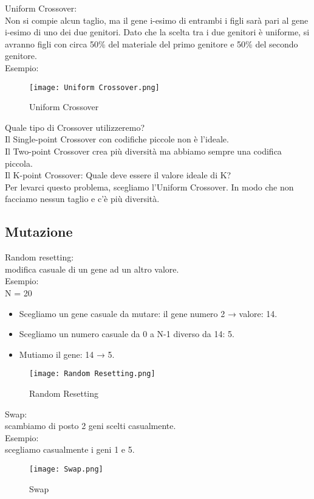 \documentclass[10pt,a4paper]{article}
\begin{document}
    Uniform Crossover:\\
    Non si compie alcun taglio, ma il gene i-esimo di entrambi i figli sarà pari al gene i-esimo di uno 
    dei due genitori. Dato che la scelta tra i due genitori è uniforme, si avranno figli 
    con circa 50\% del materiale del primo genitore e 50\% del secondo genitore.\\
    Esempio:
    \begin{figure}[h!]
      \centering
      \caption{Uniform Crossover}
      \texttt{[image: Uniform Crossover.png]}
      \label{UniformCrossover}
    \end{figure}
    
    Quale tipo di Crossover utilizzeremo?\\
    Il Single-point Crossover con codifiche piccole non è l’ideale.\\
    Il Two-point Crossover crea più diversità ma abbiamo sempre una codifica piccola.\\
    Il K-point Crossover: Quale deve essere il valore ideale di K?\\
    Per levarci questo problema, scegliamo l’Uniform Crossover. In modo che non facciamo nessun taglio 
    e c’è più diversità.\\
    
    \subsection{Mutazione}
    \label{Mutazione}
    Random resetting:\\
    modifica casuale di un gene ad un altro valore.\\
    Esempio:\\
    N = 20\\
    \begin{itemize}
      \item Scegliamo un gene casuale da mutare: il gene numero 2 → valore: 14.
      \item Scegliamo un numero casuale da 0 a N-1 diverso da 14: 5.
      \item Mutiamo il gene: 14 → 5.
    \end{itemize}
    \begin{figure}[h!]
      \centering
      \caption{Random Resetting}
      \texttt{[image: Random Resetting.png]}
      \label{Random Resetting}
    \end{figure}
    
    Swap:\\
    scambiamo di posto 2 geni scelti casualmente.\\
    Esempio:\\
    scegliamo casualmente i geni 1 e 5.
    \begin{figure}[h!]
      \centering
      \caption{Swap}
      \texttt{[image: Swap.png]}
      \label{Swap}
    \end{figure}
    
\end{document}
